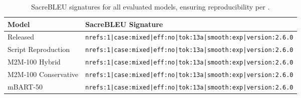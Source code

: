 \begin{table}[h]
\centering
\small
\begin{tabular}{@{}lp{6cm}@{}}
\toprule
\textbf{Model} & \textbf{SacreBLEU Signature} \\
\midrule
Released & \texttt{nrefs:1|case:mixed|eff:no|tok:13a|smooth:exp|version:2.6.0} \\
Script Reproduction & \texttt{nrefs:1|case:mixed|eff:no|tok:13a|smooth:exp|version:2.6.0} \\
M2M-100 Hybrid & \texttt{nrefs:1|case:mixed|eff:no|tok:13a|smooth:exp|version:2.6.0} \\
M2M-100 Conservative & \texttt{nrefs:1|case:mixed|eff:no|tok:13a|smooth:exp|version:2.6.0} \\
mBART-50 & \texttt{nrefs:1|case:mixed|eff:no|tok:13a|smooth:exp|version:2.6.0} \\
\bottomrule
\end{tabular}
\caption{SacreBLEU signatures for all evaluated models, ensuring reproducibility per \citet{post-2018-call}.}
\label{tab:sacrebleu-signatures}
\end{table}